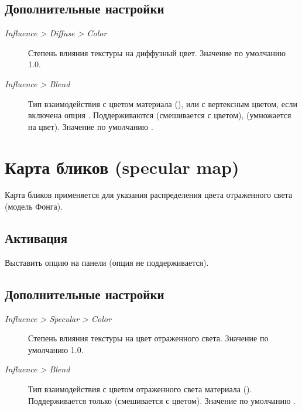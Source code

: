 \documentclass[a4paper,12pt,oneside]{sphinxmanual}
\begin{document}
\subsection{Дополнительные настройки}
\label{textures:id5}\begin{description}
\item[{\emph{Influence \textgreater{} Diffuse \textgreater{} Color}}] \leavevmode
Степень влияния текстуры на диффузный цвет. Значение по умолчанию 1.0.

\item[{\emph{Influence \textgreater{} Blend}}] \leavevmode
Тип взаимодействия с цветом материала (), или с вертексным цветом, если включена опция . Поддерживаются  (смешивается с цветом),  (умножается на цвет). Значение по умолчанию .

\end{description}


\section{Карта бликов (specular map)}
\label{textures:index-5}\label{textures:specular-map}
Карта бликов применяется для указания распределения цвета отраженного света (модель Фонга).


\subsection{Активация}
\label{textures:id6}
Выставить опцию  на панели  (опция  не поддерживается).


\subsection{Дополнительные настройки}
\label{textures:id7}\begin{description}
\item[{\emph{Influence \textgreater{} Specular \textgreater{} Color}}] \leavevmode
Степень влияния текстуры на цвет отраженного света. Значение по умолчанию 1.0.

\item[{\emph{Influence \textgreater{} Blend}}] \leavevmode
Тип взаимодействия с цветом отраженного света материала (). Поддерживается только  (смешивается с цветом). Значение по умолчанию .

\end{description}
\end{document}
